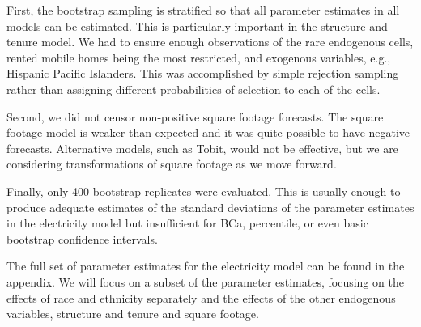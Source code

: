 \documentclass{article}
\begin{document}
First, the bootstrap sampling is stratified so that all parameter estimates in all models can be estimated.  This is particularly important in the structure and tenure model.  We had to ensure enough observations of the rare endogenous cells, rented mobile homes being the most restricted, and exogenous variables, e.g., Hispanic Pacific Islanders.  This was accomplished by simple rejection sampling rather than assigning different probabilities of selection to each of the cells.

Second, we did not censor non-positive square footage forecasts.  The square footage model is weaker than expected and it was quite possible to have negative forecasts.  Alternative models, such as Tobit, would not be effective, but we are considering transformations of square footage as we move forward.  

Finally, only 400 bootstrap replicates were evaluated.  This is usually enough to produce adequate estimates of the standard deviations of the parameter estimates in the electricity model but insufficient for BCa, percentile, or even basic bootstrap confidence intervals. 





The full set of parameter estimates for the electricity model can be found in the appendix.  We will focus on a subset of the parameter estimates, focusing on the effects of race and ethnicity separately and the effects of the other endogenous variables, structure and tenure and square footage.
\end{document}
